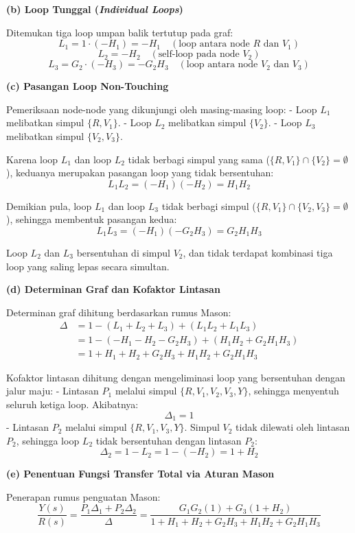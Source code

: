 \documentclass[11pt,a4paper]{article}
\begin{document}
\textbf{(b) Loop Tunggal (\textit{Individual Loops})}

Ditemukan tiga loop umpan balik tertutup pada graf:
$$L_1 = 1 \cdot (-H_1) = -H_1 \quad (\text{loop antara node } R \text{ dan } V_1)$$
$$L_2 = -H_2 \quad (\text{self-loop pada node } V_2)$$
$$L_3 = G_2 \cdot (-H_3) = -G_2 H_3 \quad (\text{loop antara node } V_2 \text{ dan } V_3)$$

\textbf{(c) Pasangan Loop Non-Touching}

Pemeriksaan node-node yang dikunjungi oleh masing-masing loop:
- Loop $L_1$ melibatkan simpul $\{R, V_1\}$.
- Loop $L_2$ melibatkan simpul $\{V_2\}$.
- Loop $L_3$ melibatkan simpul $\{V_2, V_3\}$.

Karena loop $L_1$ dan loop $L_2$ tidak berbagi simpul yang sama ($\{R, V_1\} \cap \{V_2\} = \emptyset$), keduanya merupakan pasangan loop yang tidak bersentuhan:
$$L_1 L_2 = (-H_1)(-H_2) = H_1 H_2$$

Demikian pula, loop $L_1$ dan loop $L_3$ tidak berbagi simpul ($\{R, V_1\} \cap \{V_2, V_3\} = \emptyset$), sehingga membentuk pasangan kedua:
$$L_1 L_3 = (-H_1)(-G_2 H_3) = G_2 H_1 H_3$$

Loop $L_2$ dan $L_3$ bersentuhan di simpul $V_2$, dan tidak terdapat kombinasi tiga loop yang saling lepas secara simultan.

\textbf{(d) Determinan Graf dan Kofaktor Lintasan}

Determinan graf dihitung berdasarkan rumus Mason:
\begin{align*}
    \Delta &= 1 - (L_1 + L_2 + L_3) + (L_1 L_2 + L_1 L_3) \\
    &= 1 - (-H_1 - H_2 - G_2 H_3) + (H_1 H_2 + G_2 H_1 H_3) \\
    &= 1 + H_1 + H_2 + G_2 H_3 + H_1 H_2 + G_2 H_1 H_3
\end{align*}

Kofaktor lintasan dihitung dengan mengeliminasi loop yang bersentuhan dengan jalur maju:
- Lintasan $P_1$ melalui simpul $\{R, V_1, V_2, V_3, Y\}$, sehingga menyentuh seluruh ketiga loop. Akibatnya:
  $$\Delta_1 = 1$$
- Lintasan $P_2$ melalui simpul $\{R, V_1, V_3, Y\}$. Simpul $V_2$ tidak dilewati oleh lintasan $P_2$, sehingga loop $L_2$ tidak bersentuhan dengan lintasan $P_2$:
  $$\Delta_2 = 1 - L_2 = 1 - (-H_2) = 1 + H_2$$

\textbf{(e) Penentuan Fungsi Transfer Total via Aturan Mason}

Penerapan rumus penguatan Mason:
$$\frac{Y(s)}{R(s)} = \frac{P_1 \Delta_1 + P_2 \Delta_2}{\Delta} = \frac{G_1 G_2 (1) + G_3 (1 + H_2)}{1 + H_1 + H_2 + G_2 H_3 + H_1 H_2 + G_2 H_1 H_3}$$
\end{document}
